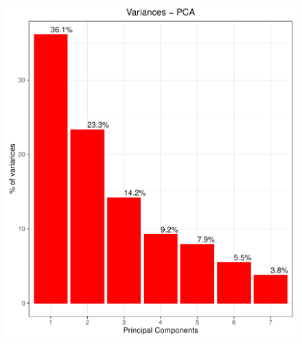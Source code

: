 \documentclass[compress]{beamer}
\begin{document}
\begin{frame}
\begin{figure}[H]
\begin{minipage}{.3\textwidth}
  \includegraphics[width=\linewidth,]{Pic/Province_FULL_Variances.pdf}
\end{minipage}
\end{figure}
\end{frame}
\end{document}
